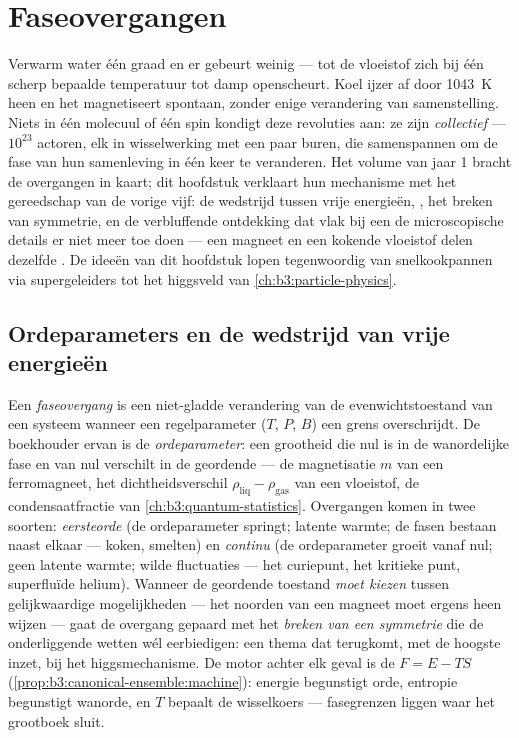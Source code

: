 \chapter{Faseovergangen}\label{ch:b3:phase-transitions}

Verwarm water één graad en er gebeurt weinig --- tot de vloeistof
zich bij één scherp bepaalde temperatuur tot damp openscheurt.
Koel ijzer af door \qty{1043}{K} heen en het magnetiseert
spontaan, zonder enige verandering van samenstelling. Niets in één
molecuul of één spin kondigt deze revoluties aan: ze zijn
\emph{collectief} --- $10^{23}$ actoren, elk in wisselwerking met
een paar buren, die samenspannen om de fase van hun samenleving in
één keer te veranderen. Het volume van jaar 1 bracht de overgangen in
kaart; dit hoofdstuk verklaart hun mechanisme met het gereedschap
van de vorige vijf: de wedstrijd tussen vrije energieën,
, het breken van symmetrie, en de verbluffende
ontdekking dat vlak bij een  de microscopische details
er niet meer toe doen --- een magneet en een kokende vloeistof
delen dezelfde . De ideeën van dit hoofdstuk
lopen tegenwoordig van snelkookpannen via supergeleiders tot het
higgsveld van \cref{ch:b3:particle-physics}.

\section{Ordeparameters en de wedstrijd van vrije energieën}

\begin{definition}\label{def:b3:phase-transitions:order}
Een \emph{faseovergang} is een niet-gladde verandering van de
evenwichtstoestand van een systeem wanneer een regelparameter
($T$, $P$, $B$) een grens overschrijdt. De boekhouder ervan is de
\emph{ordeparameter}: een grootheid die nul is in de wanordelijke
fase en van nul verschilt in de geordende --- de magnetisatie $m$
van een ferromagneet, het dichtheidsverschil
$\rho_{\text{liq}} - \rho_{\text{gas}}$ van een vloeistof, de
condensaatfractie van \cref{ch:b3:quantum-statistics}. Overgangen
komen in twee soorten: \emph{eersteorde} (de ordeparameter springt;
latente warmte; de fasen bestaan naast elkaar --- koken, smelten)
en \emph{continu} (de ordeparameter groeit vanaf nul; geen latente
warmte; wilde fluctuaties --- het curiepunt, het kritieke punt,
superfluïde helium). Wanneer de geordende toestand \emph{moet
kiezen} tussen gelijkwaardige mogelijkheden --- het noorden van een
magneet moet ergens heen wijzen --- gaat de overgang gepaard met het
\emph{breken van een symmetrie} die de onderliggende wetten wél eerbiedigen:
een thema dat terugkomt, met de hoogste inzet, bij het
higgsmechanisme. De motor achter elk geval is de 
$F = E - TS$
(\cref{prop:b3:canonical-ensemble:machine}): energie begunstigt orde,
entropie begunstigt wanorde, en $T$ bepaalt de wisselkoers ---
fasegrenzen liggen waar het grootboek sluit.
\end{definition}

